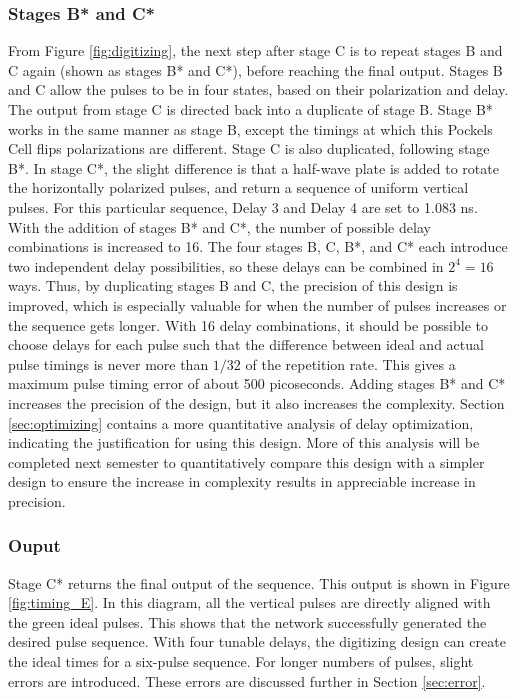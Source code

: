 \documentclass[pdftex,12pt,a4paper]{article}
\begin{document}
\subsubsection*{Stages B* and C*}

From Figure \ref{fig:digitizing}, the next step after stage C is to repeat stages B and C again (shown as stages B* and C*), before reaching the final output. Stages B and C allow the pulses to be in four states, based on their polarization and delay. The output from stage C is directed back into a duplicate of stage B. Stage B* works in the same manner as stage B, except the timings at which this Pockels Cell flips polarizations are different. Stage C is also duplicated, following stage B*. In stage C*, the slight difference is that a half-wave plate is added to rotate the horizontally polarized pulses, and return a sequence of uniform vertical pulses. For this particular sequence, Delay 3 and Delay 4 are set to 1.083 ns. With the addition of stages B* and C*, the number of possible delay combinations is increased to 16. The four stages B, C, B*, and C* each introduce two independent delay possibilities, so these delays can be combined in $2^4=16$ ways. Thus, by duplicating stages B and C, the precision of this design is improved, which is especially valuable for when the number of pulses increases or the sequence gets longer. With 16 delay combinations, it should be possible to choose delays for each pulse such that the difference between ideal and actual pulse timings is never more than $1/32$ of the repetition rate. This gives a maximum pulse timing error of about 500 picoseconds. Adding stages B* and C* increases the precision of the design, but it also increases the complexity. Section \ref{sec:optimizing} contains a more quantitative analysis of delay optimization, indicating the justification for using this design. More of this analysis will be completed next semester to quantitatively compare this design with a simpler design to ensure the increase in complexity results in appreciable increase in precision. 



\subsubsection*{Ouput}

Stage C* returns the final output of the sequence. This output is shown in Figure \ref{fig:timing_E}. In this diagram, all the vertical pulses are directly aligned with the green ideal pulses. This shows that the network successfully generated the desired pulse sequence. With four tunable delays, the digitizing design can create the ideal times for a six-pulse sequence. For longer numbers of pulses, slight errors are introduced. These errors are discussed further in Section \ref{sec:error}.
\end{document}

